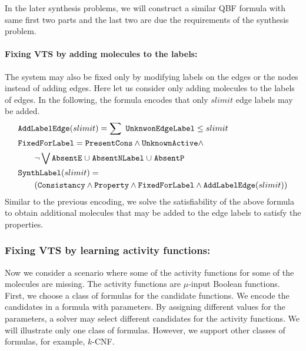 In the later synthesis problems, we will construct a similar QBF
formula with same first two parts and the last two are due the
requirements of the synthesis problem.

\paragraph{\bf Fixing VTS by adding molecules to the labels:}
The system may also be fixed only by modifying labels on the edges or the nodes instead
of adding edges.
%
Here let us consider only adding molecules to the labels of edges.
%
In the following, the formula encodes that only $slimit$ edge labels may be added.
\begin{align*}
&\texttt{AddLabelEdge}(slimit) = 
\sum~\texttt{UnknwonEdgeLabel}  \leq slimit\\
& \texttt{FixedForLabel} = \texttt{PresentCons} \land \texttt{UnknownActive} \land\\
& \quad \quad \lnot \bigvee \texttt{AbsentE} \;{\cup}\;
\texttt{AbsentNLabel} \;{\cup}\;
\texttt{AbsentP}\\
&\texttt{SynthLabel}(slimit) = \\
& \quad\quad
(  \texttt{Consistancy}\land \texttt{Property} \land
\texttt{FixedForLabel} \land \texttt{AddLabelEdge}(slimit) )
\end{align*} 
Similar to the previous encoding, we solve the
satisfiability of the above formula to obtain additional molecules
that may be added to the edge labels to satisfy the properties.

\subsubsection{Fixing VTS by learning activity functions:}
Now we consider a scenario where some of the activity functions for
some of the molecules are missing.
%
The activity functions are $\mu$-input Boolean functions.
%
First, we choose a class of formulas for the candidate functions.
%
We encode the candidates in a formula with parameters.
%
By assigning different values for the parameters, a solver may select
different candidates for the activity functions.
%
We will illustrate only one class of formulas.
%
However, we support other classes of formulas, for example, $k$-CNF.

